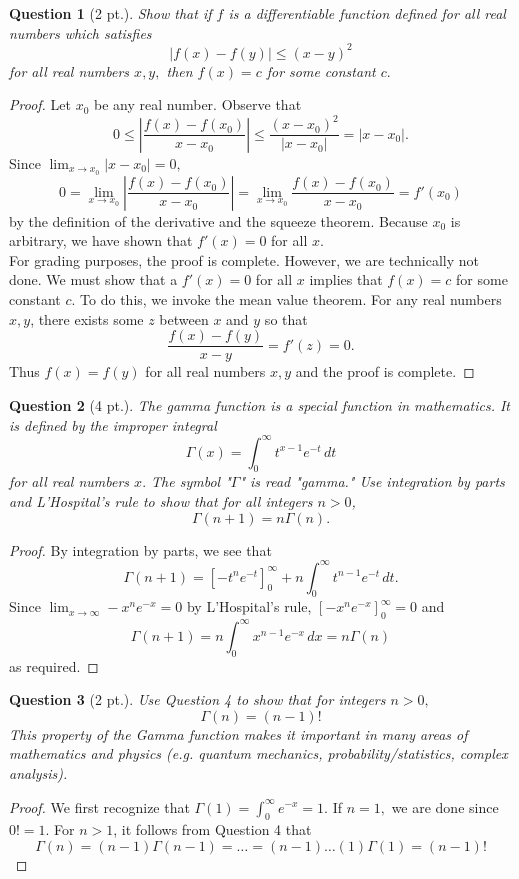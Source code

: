 \documentclass{article}
\newtheorem{question}{Question}
\begin{document}
\begin{question}[2 pt.]
Show that if $f$ is a differentiable function defined for all real numbers which satisfies $$|f(x) - f(y)| \leq (x - y)^2$$ for all real numbers $x, y,$ then $f(x) = c$ for some constant $c.$
\end{question}

\begin{proof}
Let $x_0$ be any real number. Observe that $$0 \leq \left|\frac{f(x) - f(x_0)}{x-x_0}\right| \leq \frac{(x-x_0)^2}{|x-x_0|} = |x-x_0|.$$ Since $\lim_{x \to x_0} |x - x_0| = 0,$ $$0 = \lim_{x \to x_0} \left|\frac{f(x) - f(x_0)}{x-x_0}\right| = \lim_{x \to x_0} \frac{f(x) - f(x_0)}{x-x_0} = f'(x_0)$$ by the definition of the derivative and the squeeze theorem. Because $x_0$ is arbitrary, we have shown that $f'(x) = 0$ for all $x.$ \\

For grading purposes, the proof is complete. However, we are technically not done. We must show that a $f'(x) = 0$ for all $x$ implies that $f(x) = c$ for some constant $c.$ To do this, we invoke the mean value theorem. For any real numbers $x, y$, there exists some $z$ between $x$ and $y$ so that $$\frac{f(x) - f(y)}{x - y} = f'(z) = 0.$$ Thus $f(x) = f(y)$ for all real numbers $x, y$ and the proof is complete.
\end{proof}

\begin{question}[4 pt.]
The gamma function is a special function in mathematics. It is defined by the improper integral $$\Gamma(x) = \int_0^\infty t^{x-1}e^{-t} \, dt$$ for all real numbers $x.$ The symbol "$\Gamma$" is read "gamma." Use integration by parts and L'Hospital's rule to show that for all integers $n > 0$, $$\Gamma(n+1) = n\Gamma(n).$$ 
\end{question}

\begin{proof}
By integration by parts, we see that $$\Gamma(n + 1) = \left[-t^ne^{-t}\right]_0^\infty + n\int_0^\infty t^{n-1}e^{-t} \, dt.$$ Since $\lim_{x \to \infty} -x^ne^{-x} = 0$ by L'Hospital's rule, $\left[-x^ne^{-x}\right]_0^\infty = 0$ and $$\Gamma(n + 1) = n \int_0^\infty x^{n-1}e^{-x} \, dx = n\Gamma(n)$$ as required.
\end{proof}

\begin{question}[2 pt.]
Use Question 4 to show that for integers $n > 0,$ $$\Gamma(n) = (n - 1)!$$ This property of the Gamma function makes it important in many areas of mathematics and physics (e.g. quantum mechanics, probability/statistics, complex analysis).
\end{question}

\begin{proof}
We first recognize that $\Gamma(1) = \int_0^\infty e^{-x} = 1.$ If $n = 1,$ we are done since $0! = 1$. For $n > 1$, it follows from Question 4 that $$\Gamma(n) = (n-1)\Gamma(n-1) = \dots = (n-1)\dots(1)\Gamma(1) = (n - 1)!$$
\end{proof}
\end{document}
